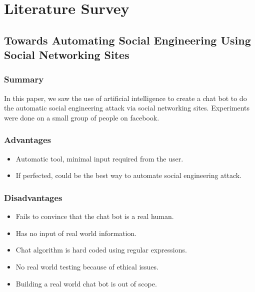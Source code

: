 \chapter{Literature Survey}

\section{Towards Automating Social Engineering Using Social Networking Sites}

\subsection{Summary}

In this paper, we saw the use of artificial intelligence to create a chat bot
to do the automatic social engineering attack via social networking sites.
Experiments were done on a small group of people on facebook.


\subsection{Advantages}

\begin{itemize}
\item{Automatic tool, minimal input required from the user.}
\item{If perfected, could be the best way to automate social engineering attack.}

\end{itemize}

\subsection{Disadvantages}

\begin{itemize}
\item{Fails to convince that the chat bot is a real human.}
\item{Has no input of real world information.}
\item{Chat algorithm is hard coded using regular expressions.}
\item{No real world testing because of ethical issues.}
\item{Building a real world chat bot is out of scope.}

\end{itemize}


